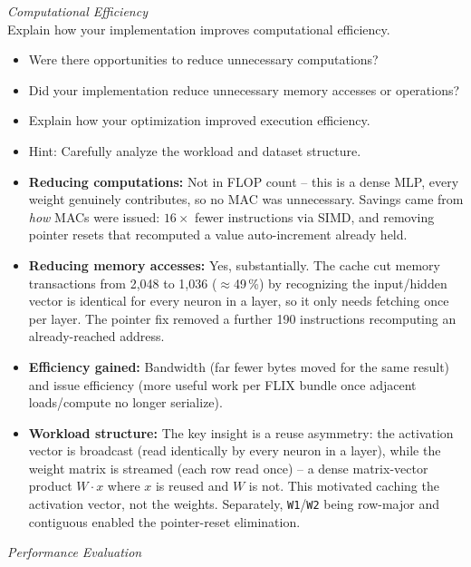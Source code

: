 \documentclass[11pt,a4paper]{report}
\newcommand{\question}[1]{\noindent\textit{#1}\\}
\newcommand{\answer}[1]{\vspace{-1.5em}\begin{oframed}#1\end{oframed}}
\begin{document}
\question{Computational Efficiency}

Explain how your implementation improves computational efficiency.
\begin{itemize}
    \item Were there opportunities to reduce unnecessary computations?
    \item Did your implementation reduce unnecessary memory accesses or operations?
    \item Explain how your optimization improved execution efficiency.
    \item Hint: Carefully analyze the workload and dataset structure.
\end{itemize}
\answer{
\begin{itemize}
    \item \textbf{Reducing computations:} Not in FLOP count -- this is a
        dense MLP, every weight genuinely contributes, so no MAC was
        unnecessary. Savings came from \emph{how} MACs were issued:
        $16\times$ fewer instructions via SIMD, and removing pointer
        resets that recomputed a value auto-increment already held.
    \item \textbf{Reducing memory accesses:} Yes, substantially. The
        cache cut memory transactions from 2{,}048 to 1{,}036
        ($\approx$49\,\%) by recognizing the input/hidden vector is
        identical for every neuron in a layer, so it only needs
        fetching once per layer. The pointer fix removed a further
        190 instructions recomputing an already-reached address.
    \item \textbf{Efficiency gained:} Bandwidth (far fewer bytes moved
        for the same result) and issue efficiency (more useful work
        per FLIX bundle once adjacent loads/compute no longer
        serialize).
    \item \textbf{Workload structure:} The key insight is a reuse
        asymmetry: the activation vector is broadcast (read
        identically by every neuron in a layer), while the weight
        matrix is streamed (each row read once) -- a dense
        matrix-vector product $W \cdot x$ where $x$ is reused and $W$
        is not. This motivated caching the activation vector, not the
        weights. Separately, \texttt{W1}/\texttt{W2} being row-major
        and contiguous enabled the pointer-reset elimination.
\end{itemize}
}
\question{Performance Evaluation}
\end{document}
